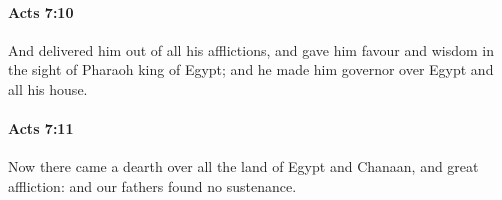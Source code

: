 		\paragraph{Acts 7:10} %
			\label{ACTS-7-10}

			And delivered him out of all his afflictions, and gave him favour and wisdom in the sight of Pharaoh king of Egypt; and he made him governor over Egypt and all his house.

			\begin{framed}
			\scriptsize
				\begin{compactdesc}
					\item[SBLG] 
				\end{compactdesc}
			\end{framed}

		\paragraph{Acts 7:11} %
			\label{ACTS-7-11}

			Now there came a dearth over all the land of Egypt and Chanaan, and great affliction: and our fathers found no sustenance.

